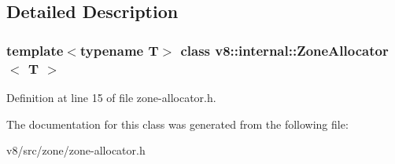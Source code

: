 \subsection{Detailed Description}
\subsubsection*{template$<$typename T$>$\newline
class v8\+::internal\+::\+Zone\+Allocator$<$ T $>$}



Definition at line 15 of file zone-\/allocator.\+h.



The documentation for this class was generated from the following file\+:\begin{DoxyCompactItemize}
\item 
v8/src/zone/zone-\/allocator.\+h\end{DoxyCompactItemize}
